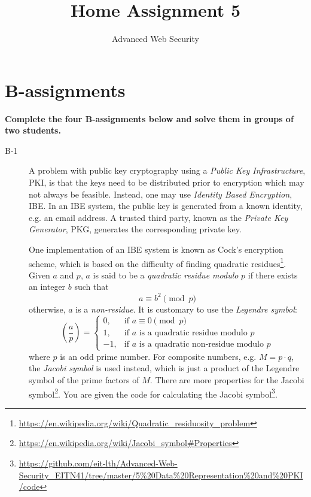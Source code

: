 \documentclass{article}
\begin{document}
\title{Home Assignment 5}
\author{Advanced Web Security}
\date{\the\year}

\maketitle

\section*{B-assignments}
\textbf{Complete the four B-assignments below and solve them in groups of two students.}

\begin{description}

	\item[B-1]{A problem with public key cryptography using a \emph{Public Key Infrastructure}, PKI, is that
    the keys need to be distributed prior to encryption which may not always be feasible.
    Instead, one may use \emph{Identity Based Encryption}, IBE. In an IBE system, the public key is generated
    from a known identity, e.g. an email address. A trusted third party, known as the \emph{Private Key Generator}, PKG,
    generates the corresponding private key.
    
    One implementation of an IBE system is known as Cock's encryption scheme,
    which is based on the difficulty of finding quadratic 
    residues\footnote{\url{https://en.wikipedia.org/wiki/Quadratic_residuosity_problem}}.
    Given $a$ and $p$, $a$ is said to be a \emph{quadratic residue modulo} $p$ if there exists an integer $b$
    such that
    \[
    a \equiv b^2 \pmod p
    \]
    otherwise, $a$ is a \emph{non-residue}.
    It is customary to use the \emph{Legendre symbol}:
    \[
    \left(\frac{a}{p}\right) = 
    \begin{cases}
    0, & \text{if $a \equiv 0 \pmod p$}\\
    1, & \text{if $a$ is a quadratic residue modulo $p$}\\
    -1, & \text{if $a$ is a quadratic non-residue modulo $p$}
    \end{cases}
    \]
    where $p$ is an odd prime number. For composite numbers, e.g. $M = p \cdot q$, the \emph{Jacobi symbol} is used
    instead, which is just a product of the Legendre symbol of the prime factors of $M$.
    There are more properties for the Jacobi symbol\footnote{\url{https://en.wikipedia.org/wiki/Jacobi_symbol\#Properties}}. 
	You are given the code for calculating the Jacobi symbol\footnote{\url{https://github.com/eit-lth/Advanced-Web-Security_EITN41/tree/master/5\%20Data\%20Representation\%20and\%20PKI/code}}.
    
}
\end{description}
\end{document}
